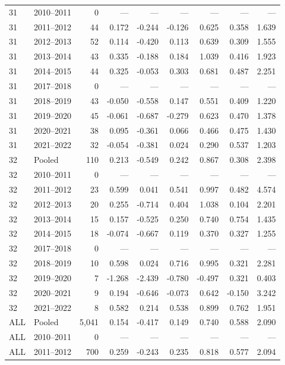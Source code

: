 \begin{longtable}{llrrrrrrr}
31 & 2010--2011 & 0 & --- & --- & --- & --- & --- & --- \\
31 & 2011--2012 & 44 & 0.172 & -0.244 & -0.126 & 0.625 & 0.358 & 1.639 \\
31 & 2012--2013 & 52 & 0.114 & -0.420 & 0.113 & 0.639 & 0.309 & 1.555 \\
31 & 2013--2014 & 43 & 0.335 & -0.188 & 0.184 & 1.039 & 0.416 & 1.923 \\
31 & 2014--2015 & 44 & 0.325 & -0.053 & 0.303 & 0.681 & 0.487 & 2.251 \\
31 & 2017--2018 & 0 & --- & --- & --- & --- & --- & --- \\
31 & 2018--2019 & 43 & -0.050 & -0.558 & 0.147 & 0.551 & 0.409 & 1.220 \\
31 & 2019--2020 & 45 & -0.061 & -0.687 & -0.279 & 0.623 & 0.470 & 1.378 \\
31 & 2020--2021 & 38 & 0.095 & -0.361 & 0.066 & 0.466 & 0.475 & 1.430 \\
31 & 2021--2022 & 32 & -0.054 & -0.381 & 0.024 & 0.290 & 0.537 & 1.203 \\
32 & Pooled & 110 & 0.213 & -0.549 & 0.242 & 0.867 & 0.308 & 2.398 \\
32 & 2010--2011 & 0 & --- & --- & --- & --- & --- & --- \\
32 & 2011--2012 & 23 & 0.599 & 0.041 & 0.541 & 0.997 & 0.482 & 4.574 \\
32 & 2012--2013 & 20 & 0.255 & -0.714 & 0.404 & 1.038 & 0.104 & 2.201 \\
32 & 2013--2014 & 15 & 0.157 & -0.525 & 0.250 & 0.740 & 0.754 & 1.435 \\
32 & 2014--2015 & 18 & -0.074 & -0.667 & 0.119 & 0.370 & 0.327 & 1.255 \\
32 & 2017--2018 & 0 & --- & --- & --- & --- & --- & --- \\
32 & 2018--2019 & 10 & 0.598 & 0.024 & 0.716 & 0.995 & 0.321 & 2.281 \\
32 & 2019--2020 & 7 & -1.268 & -2.439 & -0.780 & -0.497 & 0.321 & 0.403 \\
32 & 2020--2021 & 9 & 0.194 & -0.646 & -0.073 & 0.642 & -0.150 & 3.242 \\
32 & 2021--2022 & 8 & 0.582 & 0.214 & 0.538 & 0.899 & 0.762 & 1.951 \\
ALL & Pooled & 5,041 & 0.154 & -0.417 & 0.149 & 0.740 & 0.588 & 2.090 \\
ALL & 2010--2011 & 0 & --- & --- & --- & --- & --- & --- \\
ALL & 2011--2012 & 700 & 0.259 & -0.243 & 0.235 & 0.818 & 0.577 & 2.094 \\

\end{longtable}
